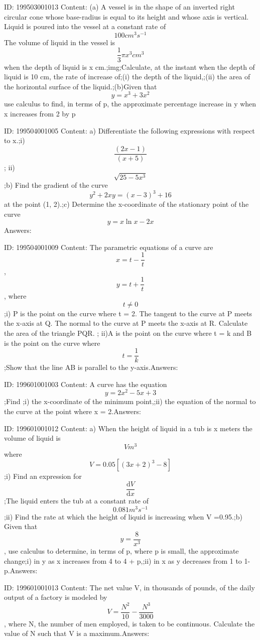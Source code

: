 \documentclass{article}
\begin{document}
ID: 199503001013
Content:
 (a)	A vessel is in the shape of an inverted right circular cone whose base-radius is equal to its height and whose axis is vertical. Liquid is poured into the vessel at a constant rate of \[100cm^3s^{-1}\] The volume of liquid in the vessel is \[\frac{1}{3}\pi x^3cm^3 \] when the depth of liquid is x cm.;img;Calculate, at the instant when the depth of liquid is 10 cm, the rate of increase of;(i)	the depth of the liquid,;(ii)	the area of the horizontal surface of the liquid.;(b)Given that \[y=x^3+3x^2 \]  use calculus to find, in terms of p, the approximate percentage increase in y when x increases from 2 by p%

ID: 199504001005
Content:
a) Differentiate the following expressions with respect to x.;i)	\[\frac{\left ( 2x-1 \right )}{\left ( x+5 \right )}\]; ii)	\[\sqrt{25-5x^3}\];b) Find the gradient of the curve  \[y^2+2xy=(x-3)^3+16\] at the point (1, 2).;c) Determine the x-coordinate of the stationary point of the curve \[y=x\ln x-2x\]Answers:

ID: 199504001009
Content:
The parametric equations of a curve are \[x=t-\frac{1}{t}\] , \[y=t+\frac{1}{t}\] , where \[t\neq 0\];i) P is the point on the curve where t = 2. The tangent to the curve at P meets the x-axis at Q. The normal to the curve at P meets the x-axis at R. Calculate the area of the triangle PQR. ; ii)A is the point on the curve where t = k and B is the point on the curve where \[t=\frac{1}{k}\];Show that the line AB is parallel to the y-axis.Answers:

ID: 199601001003
Content:
A curve has the equation \[y=2x^2-5x+3\] ;Find ;i) the x-coordinate of the minimum point,;ii) the equation of the normal to the curve at the point where x = 2.Answers:

ID: 199601001012
Content:
a) When the height of liquid in a tub is x meters the volume of liquid is  \[Vm^3\] where  \[V=0.05[(3x+2)^3-8]\] ;i) Find an expression for \[\frac{\mathrm{d} V}{\mathrm{d} x}\];The liquid enters the tub at a constant rate of \[0.081m^3s^{-1}\] ;ii)	Find the rate at which the height of liquid is increasing when V =0.95.;b) Given that \[y=\frac{8}{x^3}\], use calculus to determine, in terms of p, where p is small, the approximate change;i)	in y as x increases from 4 to 4 + p,;ii)	in x as y decreases from 1 to 1-p.Answers:

ID: 199601001013
Content:
The net value V, in thousands of pounds, of the daily output of a factory is modeled by \[V = \frac{N^2}{10}- \frac{N^3}{3000}\], where N, the number of men employed, is taken to be continuous. Calculate the value of N such that V is a maximum.Answers:
\end{document}
